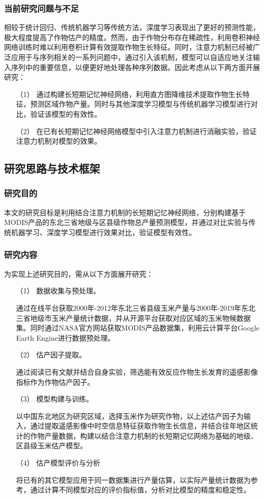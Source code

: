 \subsubsection{当前研究问题与不足}
\par 相较于统计回归、传统机器学习等传统方法，深度学习表现出了更好的预测性能，极大程度提高了作物估产的精度。然而，由于作物分布存在稀疏性，利用卷积神经网络训练时难以利用卷积计算有效提取作物生长特征。同时，注意力机制已经被广泛应用于与序列相关的一系列问题中，通过引入该机制，模型可以自适应地关注输入序列中的重要信息，以便更好地处理各种序列数据。因此考虑从以下两方面开展研究：
\begin{itemize}
  \item [（1）] 通过构建长短期记忆神经网络，利用直方图降维技术提取作物生长特征，预测区域作物产量。同时与其他深度学习模型与传统机器学习模型进行对比，验证该模型的有效性。
  \item [（2）] 在已有长短期记忆神经网络模型中引入注意力机制进行消融实验，验证注意力机制对模型的效果。
\end{itemize}

\subsection{研究思路与技术框架}

\subsubsection{研究目的}
\par 本文的研究目标是利用结合注意力机制的长短期记忆神经网络，分别构建基于MODIS产品的东北三省地级与区县级作物总产量预测模型，并通过对比实验与传统机器学习、深度学习模型进行效果对比，验证模型有效性。

\subsubsection{研究内容}
\par 为实现上述研究目的，需从以下方面展开研究：
\begin{itemize}
  \item [（1）] 数据收集与预处理。
  \par 通过在线平台获取2000年-2012年东北三省县级玉米产量与2000年-2019年东北三省地级市玉米产量统计数据，并从开源平台获取对应区域的玉米物候数据集。同时通过NASA官方网站获取MODIS产品数据集，利用云计算平台Google Earth Engine进行数据预处理。
  \item [（2）] 估产因子提取。
  \par 通过阅读已有文献并结合自身实验，筛选能有效反应作物生长发育的遥感影像指标作为作物估产因子。
  \item [（3）] 模型构建与训练。
  \par 以中国东北地区为研究区域，选择玉米作为研究作物，以上述估产因子为输入，通过提取遥感影像中时空信息特征获取作物生长信息，并结合往年地区统计的作物产量数据，构建以结合注意力机制的长短期记忆网络为基础的地级、区县级玉米估产模型。
  \item [（4）] 估产模型评价与分析
  \par 将已有的其它模型应用于同一数据集进行产量估算，以实际产量统计数据为参考，通过计算不同模型对应的评价指标值，分析对比模型的精度和稳定性。
\end{itemize}

